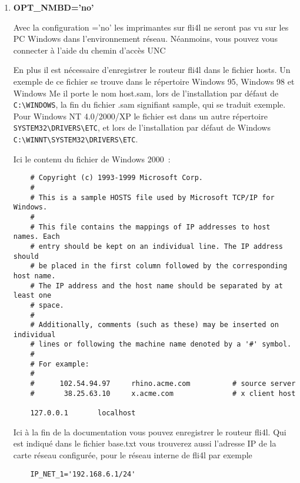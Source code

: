 \begin{enumerate}
\item \textbf{OPT\_NMBD='no'}

    Avec la configuration ='no' les
    imprimantes sur fli4l ne seront pas vu sur les PC Windows dans l'environnement
    réseau. Néanmoins, vous pouvez vous connecter à l'aide du chemin d'accès UNC

    En plus il est nécessaire d'enregistrer le routeur fli4l dans le fichier hosts.
    Un exemple de ce fichier se trouve dans le répertoire Windows 95, Windows 98
    et Windows Me il porte le nom host.sam, lors de l'installation par défaut de
    \verb+C:\WINDOWS+, la fin du fichier .sam signifiant sample, qui se traduit
    exemple. Pour Windows NT 4.0/2000/XP le fichier est dans un autre répertoire
    \verb+SYSTEM32\DRIVERS\ETC+, et lors de l'installation par défaut de Windows
    \verb+C:\WINNT\SYSTEM32\DRIVERS\ETC+.

    Ici le contenu du fichier de Windows 2000~:
\begin{example}
\begin{verbatim}
    # Copyright (c) 1993-1999 Microsoft Corp.
    #
    # This is a sample HOSTS file used by Microsoft TCP/IP for Windows.
    #
    # This file contains the mappings of IP addresses to host names. Each
    # entry should be kept on an individual line. The IP address should
    # be placed in the first column followed by the corresponding host name.
    # The IP address and the host name should be separated by at least one
    # space.
    #
    # Additionally, comments (such as these) may be inserted on individual
    # lines or following the machine name denoted by a '#' symbol.
    #
    # For example:
    #
    #      102.54.94.97     rhino.acme.com          # source server
    #       38.25.63.10     x.acme.com              # x client host

    127.0.0.1       localhost
\end{verbatim}
\end{example}

    Ici à la fin de la documentation vous pouvez enregistrer le routeur fli4l.
    Qui est indiqué dans le fichier base.txt vous trouverez aussi l'adresse IP
    de la carte réseau configurée, pour le réseau interne de fli4l par exemple

\begin{example}
\begin{verbatim}
    IP_NET_1='192.168.6.1/24'
\end{verbatim}
\end{example}


\end{enumerate}
